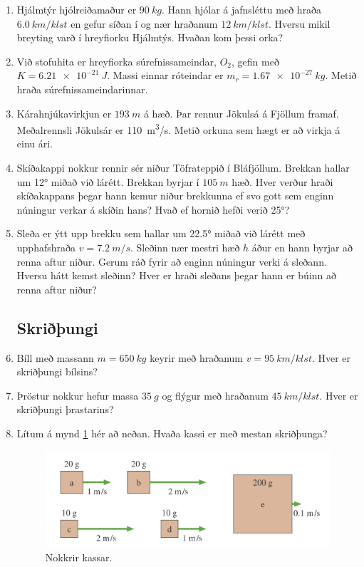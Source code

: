 \begin{enumerate}[label = \textbf{Dæmi \thechapter.\arabic*.}]
\item Hjálmtýr hjólreiðamaður er $\SI{90}{kg}$. Hann hjólar á jafnsléttu með hraða $\SI{6.0}{km/klst}$ en gefur síðan í og nær hraðanum $\SI{12}{km/klst}$. Hversu mikil breyting varð í hreyfiorku Hjálmtýs. Hvaðan kom þessi orka?

\item Við stofuhita er hreyfiorka súrefnissameindar, $O_2$, gefin með $ K = \SI{6.21e-21}{J}$. Massi einnar róteindar er $m_r = \SI{1.67e-27}{kg}$. Metið hraða súrefnissameindarinnar.

\item Kárahnjúkavirkjun er $\SI{193}{m}$ á hæð. Þar rennur Jökulsá á Fjöllum framaf. Meðalrennsli Jökulsár er \SI{110}{m^3/s}. Metið orkuna sem hægt er að virkja á einu ári.

\item Skíðakappi nokkur rennir sér niður Töfrateppið í Bláfjöllum. Brekkan hallar um \ang{12} miðað við lárétt. Brekkan byrjar í $\SI{105}{m}$ hæð. Hver verður hraði skíðakappans þegar hann kemur niður brekkunna ef svo gott sem enginn núningur verkar á skíðin hans? Hvað ef hornið hefði verið \ang{25}?

\item Sleða er ýtt upp brekku sem hallar um \ang{22.5} miðað við lárétt með upphafshraða $v = \SI{7.2}{m/s}$. Sleðinn nær mestri hæð $h$ áður en hann byrjar að renna aftur niður. Gerum ráð fyrir að enginn núningur verki á sleðann. Hversu hátt kemst sleðinn? Hver er hraði sleðans þegar hann er búinn að renna aftur niður?

\subsection*{Skriðþungi}

\item Bíll með massann $m = \SI{650}{kg}$ keyrir með hraðanum $v = \SI{95}{km/klst}$. Hver er skriðþungi bílsins?

\item Þröstur nokkur hefur massa $\SI{35}{g}$ og flýgur með hraðanum $\SI{45}{km/klst}$. Hver er skriðþungi þrastarins?

\item Lítum á mynd \ref{fig:sbrkassar2} hér að neðan. Hvaða kassi er með mestan skriðþunga?

\begin{figure}[H]
    \centering
    \includegraphics[scale = 0.3]{images/sbr.png}
    \caption{Nokkrir kassar.}
    \label{fig:sbrkassar2}
\end{figure}


\end{enumerate}
